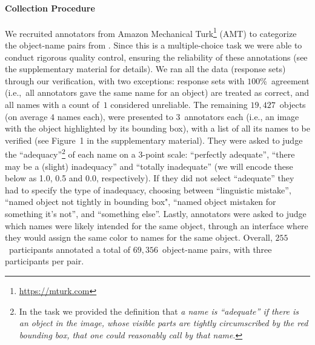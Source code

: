 
\paragraph{Collection Procedure}
\label{sect:mn_verification}

We recruited annotators from Amazon Mechanical Turk\footnote{
	\url{https://mturk.com}
} (AMT) to categorize the object-name pairs from \mn.
Since this is a multiple-choice task we were able to conduct rigorous quality control, ensuring the reliability of these annotations (see the supplementary material for details).
We ran all the \mn data (response sets) through our verification, with two exceptions: 
response sets with $100$\%~agreement (i.e.,~all annotators gave the same name for an object) are treated as correct, and all names with a count of~$1$ considered unreliable.
The remaining $19,427$~objects (on average $4$ names each), were presented to $3$~annotators each (i.e., an image with the object highlighted by its bounding box), with a list of all its names to be verified (see Figure~1 in the supplementary material).
They were asked to judge the ``adequacy''\footnote{
	In the task we provided the definition that \textit{a name is ``adequate'' if there is an object in the image, whose visible parts are tightly circumscribed by the red bounding box, that one could reasonably call by that name}.
} of each name on a 3-point scale: ``perfectly adequate'', ``there may be a (slight) inadequacy'' and ``totally inadequate'' (we will encode these below as 1.0, 0.5 and 0.0, respectively).
If they did not select ``adequate'' they had to specify the type of inadequacy, choosing between ``linguistic mistake'', ``named object not tightly in bounding box",  ``named object mistaken for something it's not'', and ``something else''.
Lastly, annotators were asked to judge which names were likely intended for the same object, through an interface where they would assign the same color to names for the same object.
Overall, $255$~participants annotated a total of $69,356$~object-name pairs, with three participants per pair.




